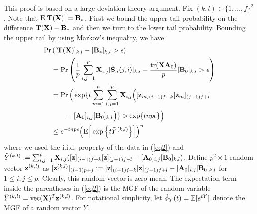 \begin{IEEEproof}
	This proof is based on a large-deviation theory argument. Fix $(k,l) \in \{1,\dots,f\}^2$. Note that ${\rm E}[{\mathbf{T}}({\mathbf{X}})]={\mathbf{B}}_*$. First we bound the upper tail probability on the difference ${\mathbf{T}}({\mathbf{X}})-{\mathbf{B}}_*$ and then we turn to the lower tail probability. Bounding the upper tail by using Markov's inequality, we have
\begin{align}
	\Pr & \left([{\mathbf{T}}({\mathbf{X}})]_{k,l}-[{\mathbf{B}}_*]_{k,l}>\epsilon \right) \nonumber \\
		&= \Pr \left(\frac{1}{p}\sum_{i,j=1}^p{{\mathbf{X}}_{i,j}[\hat{{\mathbf{S}}}_n(j,i)]_{k,l}}-\frac{{ \text{tr} }({\mathbf{X}}{\mathbf{A}}_0)}{p} [{\mathbf{B}}_0]_{k,l}>\epsilon \right) \nonumber \\
		&= \Pr \Big( \exp\{t \sum_{m=1}^n \sum_{i,j=1}^p {\mathbf{X}}_{i,j} \Big([{ \mathbf{z} }_m]_{(i-1)f+k}[{ \mathbf{z} }_m]_{(j-1)f+l} \nonumber \\
		&\qquad - [{\mathbf{A}}_0]_{i,j}[{\mathbf{B}}_0]_{k,l} \Big)\} > \exp\{t np \epsilon\} \Big)  \nonumber \\
		&\leq e^{-tnp\epsilon} \Big( {\rm E}\Big[ \exp\Big\{ t \tilde{Y}^{(k,l)} \Big\} \Big] \Big)^n \label{eq2}
\end{align}
where we used the i.i.d. property of the data in (\ref{eq2}) and $\tilde{Y}^{(k,l)}:= \sum_{i,j=1}^p {\mathbf{X}}_{i,j}([{ \mathbf{z} }]_{(i-1)f+k}[{ \mathbf{z} }]_{(j-1)f+l}-[{\mathbf{A}}_0]_{i,j}[{\mathbf{B}}_0]_{k,l})$. Define $p^2\times 1$ random vector ${ \mathbf{z} }^{(k,l)}$ as $[{ \mathbf{z} }^{(k,l)}]_{(i-1)p+j}:=[{ \mathbf{z} }]_{(i-1)f+k}[{ \mathbf{z} }]_{(j-1)f+l} -[{\mathbf{A}}_0]_{i,j}[{\mathbf{B}}_0]_{k,l}$ for $1\leq i,j\leq p$. Clearly, this random vector is zero mean. The expectation term inside the parentheses in (\ref{eq2}) is the MGF of the random variable $\tilde{Y}^{(k,l)}={ \text{vec} }({\mathbf{X}})^T{ \mathbf{z} }^{(k,l)}$. For notational simplicity, let $\tilde{\phi}_{Y}(t)={\rm E}[e^{tY}]$ denote the MGF of a random vector $Y$. 


\end{IEEEproof}
